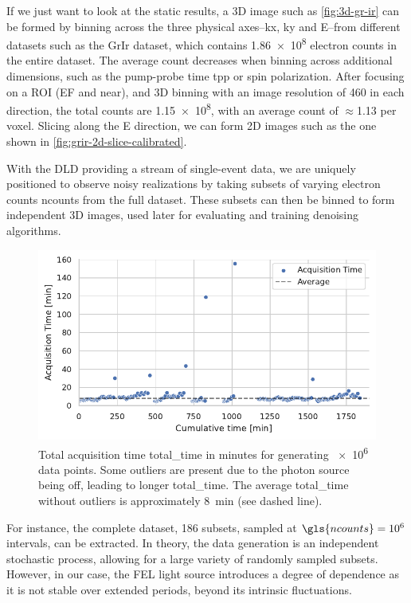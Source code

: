 If we just want to look at the static results, a 3D image such as \cref{fig:3d-gr-ir} can be formed by binning across the three physical axes--\gls{kx}, \gls{ky} and \gls{E}--from different datasets such as the \gls{GrIr} dataset, which contains \num{1.86e8} electron counts in the entire dataset. The average count decreases when binning across additional dimensions, such as the pump-probe time \gls{tpp} or spin polarization. After focusing on a \gls{ROI} (\gls{EF} and near), and 3D binning with an image resolution of \num{460} in each direction, the total counts are \num{1.15e8}, with an average count of $\approx$\num{1.13} per voxel.  Slicing along the \gls{E} direction, we can form 2D images such as the one shown in \cref{fig:grir-2d-slice-calibrated}.

With the \gls{DLD} providing a stream of single-event data, we are uniquely positioned to observe noisy realizations by taking subsets of varying electron counts \gls{ncounts} from the full dataset. These subsets can then be binned to form independent 3D images, used later for evaluating and training denoising algorithms.

\begin{figure}
    \centering
    \includegraphics[width=0.8\linewidth]{images/acq_time_1M.pdf}
    \caption{Total acquisition time \gls{total_time} in minutes for generating \num{e6} data points. Some outliers are present due to the photon source being off, leading to longer \gls{total_time}. The average \gls{total_time} without outliers is approximately \qty{8}{min} (see dashed line).}
    \label{fig:acq-time-1M}
\end{figure}


 For instance, the complete dataset, \num{186} subsets, sampled at $\gls{ncounts}=\num{e6}$ intervals, can be extracted. In theory, the data generation is an independent stochastic process, allowing for a large variety of randomly sampled subsets. However, in our case, the \gls{FEL} light source introduces a degree of dependence as it is not stable over extended periods, beyond its intrinsic fluctuations.


